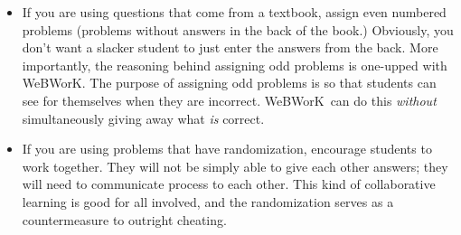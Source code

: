 \documentclass[12pt]{article}
\newcommand{\WW}{WeBWorK}
\begin{document}
\begin{itemize}
\item If you are using questions that come from a textbook, assign even numbered problems (problems without answers in the back of the book.)  Obviously, you don't want a slacker student to just enter the answers from the back.  More importantly, the reasoning behind assigning odd problems is one-upped with \WW.  The purpose of assigning odd problems is so that students can see for themselves when they are incorrect.  \WW\ can do this \emph{without} simultaneously giving away what \emph{is} correct.

\item If you are using problems that have randomization, encourage students to work together. They will not be simply able to give each other answers; they will need to communicate process to each other. This kind of collaborative learning is good for all involved, and the randomization serves as a countermeasure to outright cheating.




\end{itemize}
\end{document}
